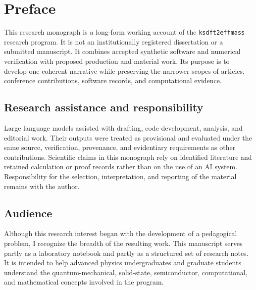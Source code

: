 \chapter*{Preface}


This research monograph is a long-form working account of the
\texttt{ksdft2effmass} research program. It is not an institutionally
registered dissertation or a submitted manuscript. It combines accepted
synthetic software and numerical verification with proposed production and
material work. Its purpose is to develop one coherent narrative while
preserving the narrower scopes of articles, conference contributions, software
records, and computational evidence.

\section*{Research assistance and responsibility}


Large language models assisted with drafting, code development, analysis, and
editorial work. Their outputs were treated as provisional and evaluated under
the same source, verification, provenance, and evidentiary requirements as
other contributions. Scientific claims in this monograph rely on identified
literature and retained calculation or proof records rather than on the use of
an AI system. Responsibility for the selection, interpretation, and reporting
of the material remains with the author.

\clearpage
\section*{Audience}


Although this research interest began with the development of a pedagogical
problem, I recognize the breadth of the resulting work. This manuscript serves
partly as a laboratory notebook and partly as a structured set of research
notes. It is intended to help advanced physics undergraduates and graduate
students understand the quantum-mechanical, solid-state, semiconductor,
computational, and mathematical concepts involved in the program.

